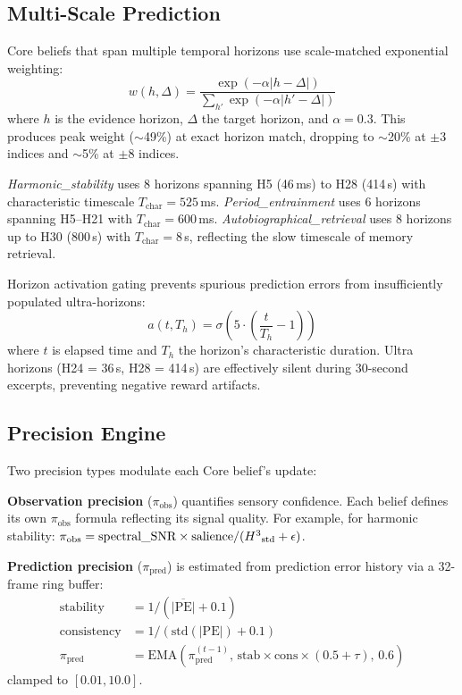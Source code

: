 \documentclass[10pt,twocolumn]{article}
\newcommand{\Hcube}{H\textsuperscript{3}}
\newcommand{\pe}{\mathrm{PE}}
\newcommand{\piobs}{\pi_{\mathrm{obs}}}
\newcommand{\pipred}{\pi_{\mathrm{pred}}}
\begin{document}
\subsection{Multi-Scale Prediction}

Core beliefs that span multiple temporal horizons use scale-matched exponential weighting:
\begin{equation}
w(h, \Delta) = \frac{\exp(-\alpha |h - \Delta|)}{\sum_{h'} \exp(-\alpha |h' - \Delta|)}
\label{eq:scaleweight}
\end{equation}
where $h$ is the evidence horizon, $\Delta$ the target horizon, and $\alpha = 0.3$.
This produces peak weight ($\sim$49\%) at exact horizon match, dropping to $\sim$20\% at $\pm 3$ indices and $\sim$5\% at $\pm 8$ indices.

\emph{Harmonic\_stability} uses 8 horizons spanning H5 (46\,ms) to H28 (414\,s) with characteristic timescale $T_{\mathrm{char}} = 525$\,ms.
\emph{Period\_entrainment} uses 6 horizons spanning H5--H21 with $T_{\mathrm{char}} = 600$\,ms.
\emph{Autobiographical\_retrieval} uses 8 horizons up to H30 (800\,s) with $T_{\mathrm{char}} = 8$\,s, reflecting the slow timescale of memory retrieval.

Horizon activation gating prevents spurious prediction errors from insufficiently populated ultra-horizons:
\begin{equation}
a(t, T_h) = \sigma\!\left(5 \cdot \left(\frac{t}{T_h} - 1\right)\right)
\label{eq:activation}
\end{equation}
where $t$ is elapsed time and $T_h$ the horizon's characteristic duration.
Ultra horizons (H24 = 36\,s, H28 = 414\,s) are effectively silent during 30-second excerpts, preventing negative reward artifacts.

\subsection{Precision Engine}
\label{sec:precision}

Two precision types modulate each Core belief's update:

\textbf{Observation precision} ($\piobs$) quantifies sensory confidence.
Each belief defines its own $\piobs$ formula reflecting its signal quality.
For example, for harmonic stability: $\piobs = \text{spectral\_SNR} \times \text{salience} / (\Hcube_{\text{std}} + \epsilon)$.

\textbf{Prediction precision} ($\pipred$) is estimated from prediction error history via a 32-frame ring buffer:
\begin{align}
\text{stability} &= 1 / (\overline{|\pe|} + 0.1) \label{eq:stability} \\
\text{consistency} &= 1 / (\text{std}(|\pe|) + 0.1) \\
\pipred &= \text{EMA}(\pipred^{(t-1)},\, \text{stab} \times \text{cons} \times (0.5 + \tau),\, 0.6)
\end{align}
clamped to $[0.01, 10.0]$.
\end{document}
